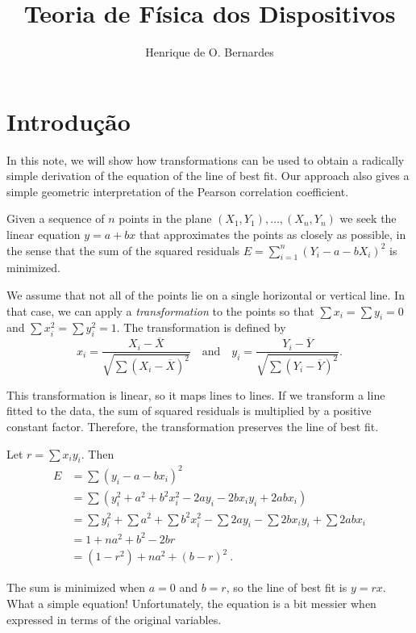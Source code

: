 \documentclass{article}
\begin{document}
\title{Teoria de Física dos Dispositivos}
\author{Henrique de O. Bernardes}
\maketitle
\thispagestyle{empty}
\section{Introdução}

\iffalse
In this note, we will show how transformations can be used to obtain
a radically simple derivation of the equation of the line of best fit.
Our approach also gives a simple geometric interpretation of the Pearson
correlation coefficient.

Given a sequence of $n$ points in the plane $(X_1, Y_1), \ldots, (X_n, Y_n)$
we seek the linear equation $y = a + bx$ that approximates the points
as closely as possible, in the sense that the sum of the squared residuals
$E = \sum_{i=1}^n (Y_i - a - bX_i)^2$ is minimized.

We assume that not all of the points lie on a single horizontal or vertical
line. In that case, we can apply a \emph{transformation} to the points
so that $\sum x_i = \sum y_i = 0$ and $\sum x_i^2 = \sum y_i^2 = 1$.
The transformation is defined by
$$
x_i = \frac{X_i - \overline{X}}{\sqrt{\sum (X_i - \overline{X})^2}}\quad\text{and}\quad
y_i = \frac{Y_i - \overline{Y}}{\sqrt{\sum (Y_i - \overline{Y})^2}}.
$$

This transformation is linear, so it maps lines to lines.
If we transform a line fitted to the data,
the sum of squared residuals is multiplied by a positive constant factor.
Therefore, the transformation preserves the line of best fit.


Let $r = \sum x_i y_i$. Then
\begin{align*}
E &= \sum (y_i - a - bx_i)^2 \\
&= \sum (y_i^2 + a^2 + b^2 x_i^2 - 2ay_i - 2bx_iy_i + 2abx_i) \\
&= \sum y_i^2 + \sum a^2 + \sum b^2 x_i^2 
 - \sum 2ay_i - \sum 2bx_iy_i + \sum 2abx_i \\
&= 1 + na^2 + b^2 - 2br \\
&= (1-r^2) + na^2 + (b - r)^2\ .
\end{align*}

The sum is minimized when $a = 0$ and $b = r$, so the line of best fit is
$y = rx$. What a simple equation!
Unfortunately, the equation is a bit messier when expressed in terms of the
original variables.
\end{document}
